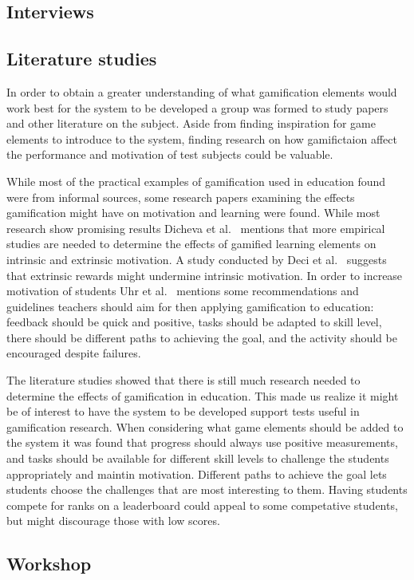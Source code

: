 \subsection{Interviews}

\subsection{Literature studies}
In order to obtain a greater understanding of what gamification elements would work best for the system to be developed a group was formed to study papers and other literature on the subject. Aside from finding inspiration for game elements to introduce to the system, finding research on how gamifictaion affect the performance and motivation of test subjects could be valuable.

While most of the practical examples of gamification used in education found were from informal sources, some research papers examining the effects gamification might have on motivation and learning were found. While most research show promising results Dicheva et al.~\cite{ref:dicheva} mentions that more empirical studies are needed to determine the effects of gamified learning elements on intrinsic and extrinsic motivation. A study conducted by Deci et al.~\cite{ref:deci} suggests that extrinsic rewards might undermine intrinsic motivation. In order to increase motivation of students Uhr et al.~\cite{ref:uhr} mentions some recommendations and guidelines teachers should aim for then applying gamification to education: feedback should be quick and positive, tasks should be adapted to skill level, there should be different paths to achieving the goal, and the activity should be encouraged despite failures.

The literature studies showed that there is still much research needed to determine the effects of gamification in education. This made us realize it might be of interest to have the system to be developed support tests useful in gamification research. When considering what game elements should be added to the system it was found that progress should always use positive measurements, and tasks should be available for different skill levels to challenge the students appropriately and maintin motivation. Different paths to achieve the goal lets students choose the challenges that are most interesting to them. Having students compete for ranks on a leaderboard could appeal to some competative students, but might discourage those with low scores.

\subsection{Workshop}
